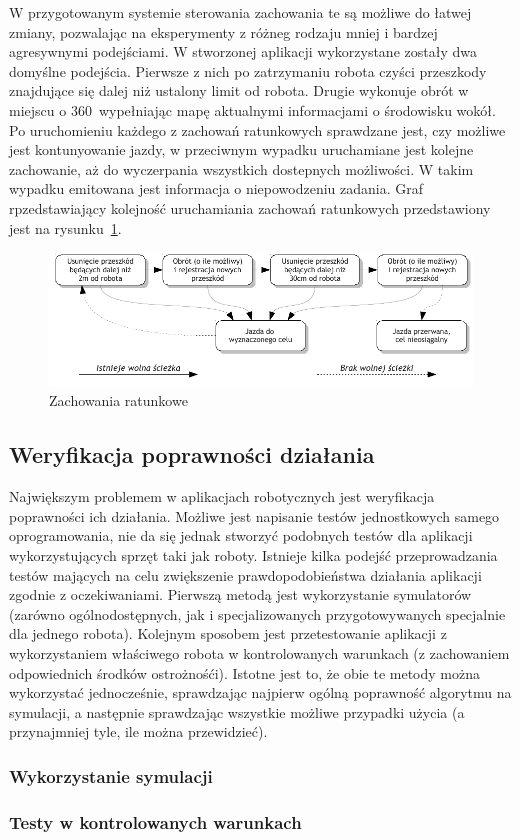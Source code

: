 W przygotowanym systemie sterowania zachowania te są możliwe do łatwej zmiany, pozwalając
na eksperymenty z różneg rodzaju mniej i bardzej agresywnymi podejściami. W stworzonej
aplikacji wykorzystane zostały dwa domyślne podejścia. Pierwsze z nich po zatrzymaniu
robota czyści przeszkody znajdujące się dalej niż ustalony limit od robota. Drugie
wykonuje obrót w miejscu o 360\textdegree~wypełniając mapę aktualnymi informacjami
o środowisku wokół. Po uruchomieniu każdego z zachowań ratunkowych sprawdzane jest,
czy możliwe jest kontunyowanie jazdy, w przeciwnym wypadku uruchamiane jest kolejne
zachowanie, aż do wyczerpania wszystkich dostepnych możliwości. W takim wypadku
emitowana jest informacja o niepowodzeniu zadania. Graf rpzedstawiający kolejność
uruchamiania zachowań ratunkowych przedstawiony jest na rysunku~\ref{fig:recovery}.

\begin{figure}[h!]
\centering
\includegraphics[width=\textwidth]{../img/recovery}
\caption{Zachowania ratunkowe}
\label{fig:recovery}
\end{figure}

\subsection{Weryfikacja poprawności działania}

Największym problemem w aplikacjach robotycznych jest weryfikacja poprawności ich
działania. Możliwe jest napisanie testów jednostkowych samego oprogramowania,
nie da się jednak stworzyć podobnych testów dla aplikacji wykorzystujących sprzęt
taki jak roboty. Istnieje kilka podejść przeprowadzania testów mających na celu
zwiększenie prawdopodobieństwa działania aplikacji zgodnie z oczekiwaniami.
Pierwszą metodą jest wykorzystanie symulatorów (zarówno ogólnodostępnych, jak
i specjalizowanych przygotowywanych specjalnie dla jednego robota). Kolejnym sposobem
jest przetestowanie aplikacji z wykorzystaniem właściwego robota w kontrolowanych
warunkach (z zachowaniem odpowiednich środków ostrożnośći). Istotne jest to, że
obie te metody można wykorzystać jednocześnie, sprawdzając najpierw ogólną poprawność
algorytmu na symulacji, a następnie sprawdzając wszystkie możliwe przypadki użycia
(a przynajmniej tyle, ile można przewidzieć).

\subsubsection{Wykorzystanie symulacji}



\subsubsection{Testy w kontrolowanych warunkach}



